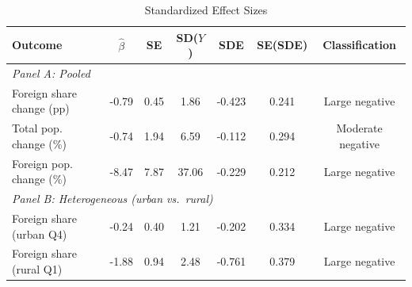 \begin{table}[t]
\centering
\caption{Standardized Effect Sizes}
\label{tab:sde}
\begin{tabular}{lcccccc}
\hline\hline
Outcome & $\hat{\beta}$ & SE & SD($Y$) & SDE & SE(SDE) & Classification \\
\hline
\multicolumn{7}{l}{\textit{Panel A: Pooled}} \\
[4pt]
Foreign share change (pp) & -0.79 & 0.45 & 1.86 & -0.423 & 0.241 & Large negative \\
Total pop. change (\%) & -0.74 & 1.94 & 6.59 & -0.112 & 0.294 & Moderate negative \\
Foreign pop. change (\%) & -8.47 & 7.87 & 37.06 & -0.229 & 0.212 & Large negative \\
[8pt]
\multicolumn{7}{l}{\textit{Panel B: Heterogeneous (urban vs.\ rural)}} \\
[4pt]
Foreign share (urban Q4) & -0.24 & 0.40 & 1.21 & -0.202 & 0.334 & Large negative \\
Foreign share (rural Q1) & -1.88 & 0.94 & 2.48 & -0.761 & 0.379 & Large negative \\
\hline\hline
\end{tabular}
\begin{tablenotes}[flushleft]
\small

\end{tablenotes}
\end{table}
